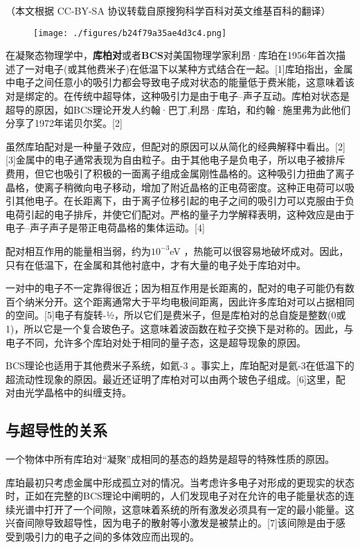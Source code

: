 
（本文根据 CC-BY-SA 协议转载自原搜狗科学百科对英文维基百科的翻译）

\begin{figure}[ht]
\centering
\texttt{[image: ./figures/b24f79a35ae4d3c4.png]}
\caption\label{fig_KBD_1}
\end{figure}

在凝聚态物理学中，\textbf{库柏对}或者\textbf{BCS}对美国物理学家利昂·库珀在1956年首次描述了一对电子(或其他费米子)在低温下以某种方式结合在一起。[1]库珀指出，金属中电子之间任意小的吸引力都会导致电子成对状态的能量低于费米能，这意味着该对是绑定的。在传统中超导体，这种吸引力是由于电子–声子互动。库柏对状态是超导的原因，如BCS理论开发人约翰·巴丁,利昂·库珀，和约翰·施里弗为此他们分享了1972年诺贝尔奖。[2]

虽然库珀配对是一种量子效应，但配对的原因可以从简化的经典解释中看出。[2][3]金属中的电子通常表现为自由粒子。由于其他电子是负电子，所以电子被排斥费用，但它也吸引了积极的一面离子组成金属刚性晶格的。这种吸引力扭曲了离子晶格，使离子稍微向电子移动，增加了附近晶格的正电荷密度。这种正电荷可以吸引其他电子。在长距离下，由于离子位移引起的电子之间的吸引力可以克服由于负电荷引起的电子排斥，并使它们配对。严格的量子力学解释表明，这种效应是由于电子–声子声子是带正电荷晶格的集体运动。[4]

配对相互作用的能量相当弱，约为$10^{-3}$eV ，热能可以很容易地破坏成对。因此，只有在低温下，在金属和其他衬底中，才有大量的电子处于库珀对中。

一对中的电子不一定靠得很近；因为相互作用是长距离的，配对的电子可能仍有数百个纳米分开。这个距离通常大于平均电极间距离，因此许多库珀对可以占据相同的空间。[5]电子有旋转-1⁄2，所以它们是费米子，但是库柏对的总自旋是整数(0或1)，所以它是一个复合玻色子。这意味着波函数在粒子交换下是对称的。因此，与电子不同，允许多个库珀对处于相同的量子态，这是超导现象的原因。

BCS理论也适用于其他费米子系统，如氦-3 。事实上，库珀配对是氦-3在低温下的超流动性现象的原因。最近还证明了库柏对可以由两个玻色子组成。[6]这里，配对由光学晶格中的纠缠支持。

\subsection{与超导性的关系}
一个物体中所有库珀对“凝聚”成相同的基态的趋势是超导的特殊性质的原因。

库珀最初只考虑金属中形成孤立对的情况。当考虑许多电子对形成的更现实的状态时，正如在完整的BCS理论中阐明的，人们发现电子对在允许的电子能量状态的连续光谱中打开了一个间隙，这意味着系统的所有激发必须具有一定的最小能量。这兴奋间隙导致超导性，因为电子的散射等小激发是被禁止的。[7]该间隙是由于感受到吸引力的电子之间的多体效应而出现的。

